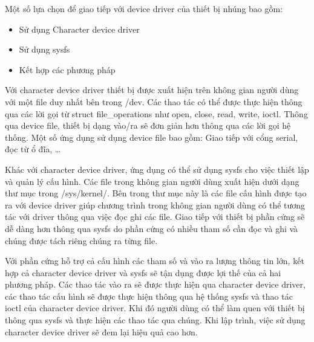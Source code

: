 
Một số lựa chọn để giao tiếp với device driver của thiết bị nhúng bao gồm:

\begin{itemize}
	\item Sử dụng Character device driver
	\item Sử dụng sysfs
	\item Kết hợp các phương pháp
\end{itemize}
	

Với character device driver thiết bị được xuất hiện trên không gian người dùng với một file duy nhất bên trong /dev. Các thao tác có thể được thực hiện thông qua các lời gọi từ struct file\_operations như open, close, read, write, ioctl. Thông qua device file, thiết bị dạng vào/ra sẽ đơn giản hơn thông qua các lời gọi hệ thống. Một số ứng dụng sử dụng device file bao gồm: Giao tiếp với cổng serial, đọc từ ổ đĩa, …

Khác với character device driver, ứng dụng có thể sử dụng sysfs cho việc thiết lập và quản lý cấu hình. Các file trong không gian người dùng xuất hiện dưới dạng thư mục trong /sys/kernel/. Bên trong thư mục này là các file cấu hình được tạo ra với device driver giúp chương trình trong không gian người dùng có thể tương tác với driver thông qua việc đọc ghi các file. Giao tiếp với thiết bị phần cứng sẽ dễ dàng hơn thông qua sysfs do phần cứng có nhiều tham số cần đọc và ghi và chúng được tách riêng chúng ra từng file.

Với phần cứng hỗ trợ cả cấu hình các tham số và vào ra lượng thông tin lớn, kết hợp cả character device driver và sysfs sẽ tận dụng được lợi thế của cả hai phương pháp. Các thao tác vào ra sẽ được thực hiện qua character device driver, các thao tác cấu hình sẽ được thực hiện thông qua hệ thống sysfs và thao tác ioctl của character device driver. Khi đó người dùng có thể làm quen với thiết bị thông qua sysfs và thực hiện các thao tác qua chúng. Khi lập trình, việc sử dụng character device driver sẽ đem lại hiệu quả cao hơn.
